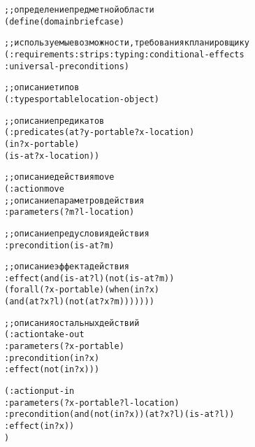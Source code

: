 \begin{mdframed}[style=excode] 
\begin{alltt} 
;; определение предметной области
(define (domain briefcase)

  ;; используемые возможности, требования к планировщику  
  (:requirements :strips :typing :conditional-effects
                 :universal-preconditions)

  ;; описание типов
  (:types portable location - object)
  
  ;; описание предикатов
  (:predicates (at ?y - portable ?x - location)
               (in ?x - portable)
               (is-at ?x - location))
  
  ;; описание действия move
  (:action move
      ;; описание параметров действия
      :parameters (?m ?l - location)
      
      ;; описание предусловия действия
      :precondition  (is-at ?m)

      ;; описание эффекта действия
      :effect (and (is-at ?l) (not (is-at ?m))
                (forall (?x - portable) (when (in ?x)
                (and (at ?x ?l) (not (at ?x ?m)))))))

  ;; описания остальных действий
  (:action take-out
      :parameters (?x - portable)
      :precondition (in ?x)
      :effect (not (in ?x)))
      
  (:action put-in
      :parameters (?x - portable ?l - location)
      :precondition (and (not (in ?x)) (at ?x ?l) (is-at ?l))
      :effect (in ?x))
) 
\end{alltt} 
\end{mdframed}

